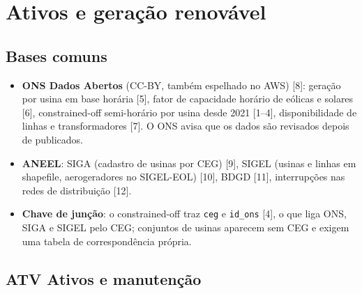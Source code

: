 
\section{Ativos e geração renovável}

\subsection*{Bases comuns}
\begin{itemize}
  \item \textbf{ONS Dados Abertos} (CC-BY, também espelhado no AWS) [8]: geração
    por usina em base horária [5], fator de capacidade horário de eólicas e
    solares [6], constrained-off semi-horário por usina desde 2021 [1--4],
    disponibilidade de linhas e transformadores [7]. O ONS avisa que os dados
    são revisados depois de publicados.
  \item \textbf{ANEEL}: SIGA (cadastro de usinas por CEG) [9], SIGEL (usinas e
    linhas em shapefile, aerogeradores no SIGEL-EOL) [10], BDGD [11],
    interrupções nas redes de distribuição [12].
  \item \textbf{Chave de junção}: o constrained-off traz \texttt{ceg} e
    \texttt{id\_ons} [4], o que liga ONS, SIGA e SIGEL pelo CEG; conjuntos de
    usinas aparecem sem CEG e exigem uma tabela de correspondência própria.
\end{itemize}

\subsection{ATV \textperiodcentered{} Ativos e manutenção}

